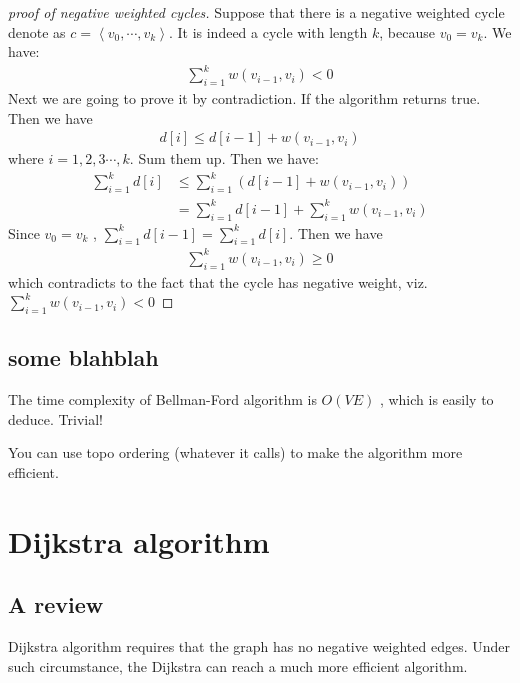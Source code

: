 \documentclass[a4paper, 10pt]{ctexart} %
\begin{document}
\begin{proof}[proof of negative weighted cycles]
    Suppose that there is a 
    negative weighted cycle
    denote as
    $c = \left< v_0 , \cdots   , v_{k} \right>$.
    It is indeed a cycle with length $k$, because $v_{0} = v_{k}$.
    We have: 
    \begin{align*}
        \sum_{i=1} ^{k} w \left( v _{i-1} , v_{i}\right) < 0
    \end{align*}
    Next we are going to prove it by contradiction. 
    If the algorithm returns true. Then 
    we have 
    \begin{align*}
        d[i] \le d[i-1] + w\left( v_{i-1} , v_{i}\right) 
    \end{align*}
    where $i =  1 , 2 , 3 \cdots , k$. Sum them up. Then 
    we have:
    \begin{align*}
        \sum_{ i=1}  ^{k} d [i  ]  & \le 
        \sum_{i = 1 } ^{k} \left( d \left[ i-1 \right] + w \left( v_{i-1} , v_{i}\right)\right)  \\
        &  = \sum_{i=1  } ^{k} d[i-1] + \sum_{i=1} ^{k} w \left( v_{i-1 }, v_{i}\right)
    \end{align*}
    Since $v_{0} = v_{k} $ , $\sum_{i=1} ^{k} d[i-1 ] = \sum_{i=1} ^{k} d [i    ]$.
    Then we have 
    \begin{align*}
        \sum_{i=1} ^{k} w \left( v_{i-1} , v_{i} \right) \ge 0 
    \end{align*}
    which contradicts to the fact that the cycle has negative weight,
    viz.
    $\sum_{i=1} ^{k} w \left( v_{i-1} , v   _{i} \right) < 0$
\end{proof}
\subsection{some blahblah}
The time complexity of Bellman-Ford algorithm is $O \left(VE\right)$ 
, which is easily to deduce. Trivial!

You can use topo ordering (whatever it calls) to 
make the algorithm more efficient.
\section{Dijkstra algorithm}
\subsection{A review}
Dijkstra algorithm requires that 
the graph has no 
negative weighted edges. Under such 
circumstance, the Dijkstra can 
reach a much more efficient algorithm.
\end{document}
